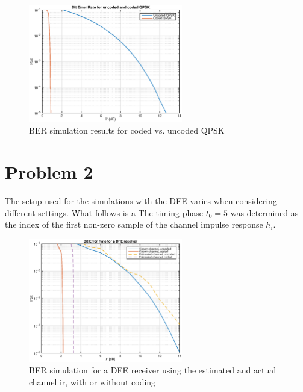 \documentclass[10pt]{article}
\begin{document}
\begin{figure}
	\centering
	\includegraphics[width = 0.6\textwidth]{problem1}
	\caption{BER simulation results for coded vs. uncoded QPSK}
	\label{fig:problem1_pbit}
\end{figure}




\section*{Problem 2}
The setup used for the simulations with the DFE varies when considering different settings. What follows is a 
The timing phase $t_0 = 5$ was determined as the index of the first non-zero sample of the channel impulse response ${h_i}$.




\begin{figure}
	\centering
	\includegraphics[width = 0.6\textwidth]{problem2}
	\caption{BER simulation for a DFE receiver using the estimated and actual channel ir, with or without coding}
	\label{fig:problem2_pbit}
\end{figure}
\end{document}
